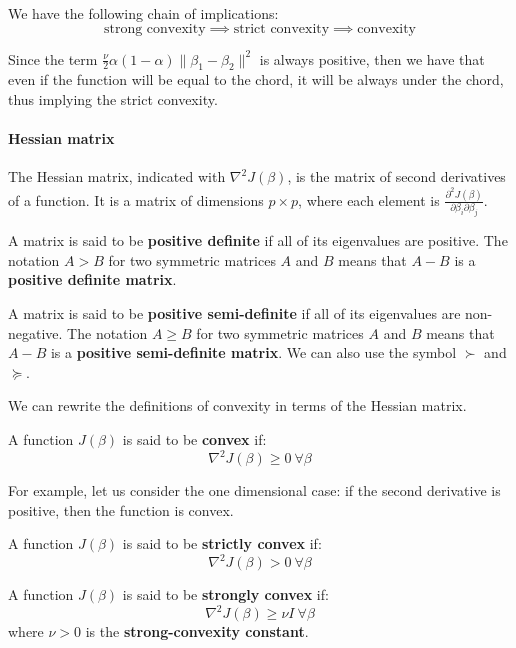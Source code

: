 \begin{theorem}
    We have the following chain of implications:
    \[
        \text{strong convexity} \implies \text{strict convexity} \implies \text{convexity}
    \]
\end{theorem}
Since the term $\frac{\nu}{2} \alpha (1-\alpha) \| \beta_1 - \beta_2 \|^2$ is always positive, then we have that even if the function will be equal to the chord, it will be always under the chord, thus implying the strict convexity.
\paragraph*{Hessian matrix}
The Hessian matrix, indicated with $\nabla^2 J(\beta)$, is the matrix of second derivatives of a function. It is a matrix of dimensions $p \times p$, where each element is $\frac{\partial^2 J(\beta)}{\partial \beta_i \partial \beta_j}$.

\begin{definition}
    A matrix is said to be \textbf{positive definite} if all of its eigenvalues are positive. The notation $A > B$ for two symmetric matrices $A$ and $B$ means that $A-B$ is a \textbf{positive definite matrix}.
\end{definition}

\begin{definition}
    A matrix is said to be \textbf{positive semi-definite} if all of its eigenvalues are non-negative. The notation $A \geq B$ for two symmetric matrices $A$ and $B$ means that $A-B$ is a \textbf{positive semi-definite matrix}. We can also use the symbol $\succ$ and $\succeq$.
\end{definition}

We can rewrite the definitions of convexity in terms of the Hessian matrix.
\begin{definition}
    A function $J(\beta)$ is said to be \textbf{convex} if:
    \[
        \nabla^2 J(\beta) \geq 0 \ \forall \beta
    \]
\end{definition}

For example, let us consider the one dimensional case: if the second derivative is positive, then the function is convex.

\begin{definition}
    A function $J(\beta)$ is said to be \textbf{strictly convex} if:
    \[
        \nabla^2 J(\beta) > 0 \ \forall \beta
    \]
\end{definition}

\begin{definition}
    A function $J(\beta)$ is said to be \textbf{strongly convex} if:
    \[
        \nabla^2 J(\beta) \geq \nu I \ \forall \beta
    \]
    where $\nu > 0$ is the \textbf{strong-convexity constant}.
\end{definition}

